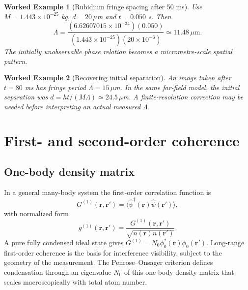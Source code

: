 \documentclass[11pt,a4paper]{article}
\newtheorem{example}{Worked Example}
\begin{document}
\begin{center}\end{center}

\begin{example}[Rubidium fringe spacing after 50 ms]
Use $M=1.443\times10^{-25}$ kg, $d=20\,\mu$m and $t=0.050$ s. Then
\[\Lambda=\frac{(6.62607015\times10^{-34})(0.050)}{(1.443\times10^{-25})(20\times10^{-6})}\simeq 11.48\,\mu\mathrm m.\]
The initially unobservable phase relation becomes a micrometre-scale spatial pattern.
\end{example}

\begin{example}[Recovering initial separation]
An image taken after $t=80$ ms has fringe period $\Lambda=15\,\mu$m. In the same far-field model, the initial separation was $d=ht/(M\Lambda)\simeq24.5\,\mu$m. A finite-resolution correction may be needed before interpreting an actual measured $\Lambda$.
\end{example}

\section{First- and second-order coherence}
\subsection{One-body density matrix}
In a general many-body system the first-order correlation function is
\begin{equation}
G^{(1)}(\mathbf r,\mathbf r')=\langle\hat\psi^\dagger(\mathbf r)\hat\psi(\mathbf r')\rangle,
\end{equation}
with normalized form
\begin{equation}
g^{(1)}(\mathbf r,\mathbf r')=\frac{G^{(1)}(\mathbf r,\mathbf r')}{\sqrt{n(\mathbf r)n(\mathbf r')}}.
\end{equation}
A pure fully condensed ideal state gives $G^{(1)}=N_0\phi_0^*(\mathbf r)\phi_0(\mathbf r')$. Long-range first-order coherence is the basis for interference visibility, subject to the geometry of the measurement. The Penrose--Onsager criterion defines condensation through an eigenvalue $N_0$ of this one-body density matrix that scales macroscopically with total atom number.
\end{document}
